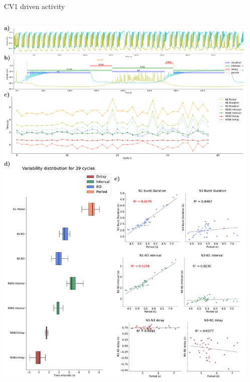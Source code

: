 \documentclass[aspectratio=43]{beamer}
\begin{document}
\begin{frame}{CV1 driven activity}
	\begin{columns}
		\begin{column}{0.5\textwidth}
			\includegraphics[width=\textwidth]{invariants/data/SUSSEX/CV1a_driven1/images/2phases/panel_with_intervals.pdf}
		\end{column}
		\begin{column}{0.5\textwidth}

\end{column}
\end{columns}
\end{frame}
\end{document}
